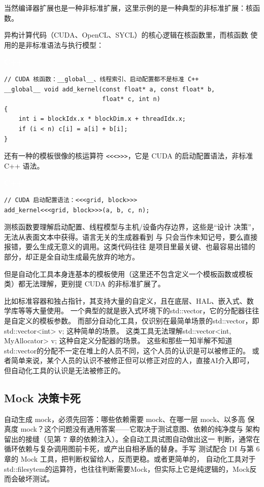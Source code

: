 \documentclass[12pt,a4paper,fontset=fandol]{ctexbook}
\newcommand{\cpplabel}{%
  \begin{tcolorbox}[enhanced,colback=cppheadbg,colframe=cppheadbg,
    arc=1mm,boxrule=0mm,left=6pt,right=6pt,top=2pt,bottom=2pt,
    halign=left,oversize]
    \textcolor{white}{\small\bfseries C++}
  \end{tcolorbox}\vspace{-4pt}}
\begin{document}
当然编译器扩展也是一种非标准扩展，这里示例的是一种典型的非标准扩展：核函数。

异构计算代码（CUDA、OpenCL、SYCL）的核心逻辑在核函数里，而核函数
使用的是非标准语法与执行模型：

\cpplabel
\begin{lstlisting}
// CUDA 核函数：__global__、线程索引、启动配置都不是标准 C++
__global__ void add_kernel(const float* a, const float* b,
                           float* c, int n)
{
    int i = blockIdx.x * blockDim.x + threadIdx.x;
    if (i < n) c[i] = a[i] + b[i];
}
\end{lstlisting}

还有一种的模板很像的核运算符 \texttt{<<<>>>}，它是 CUDA 的启动配置语法，非标准 C++ 语法。

\cpplabel
\begin{lstlisting}
// CUDA 启动配置语法：<<<grid, block>>>
add_kernel<<<grid, block>>>(a, b, c, n);
\end{lstlisting}

测核函数要理解启动配置、线程模型与主机/设备内存边界，这些是“设计
决策”，无法从表面文本中获得。语言无关的生成器看到
 与 
只会当作未知记号，要么直接报错，要么生成无意义的调用。这类代码往往
是项目里最关键、也最容易出错的部分，却正是全自动生成最先放弃的地方。

但是自动化工具本身连基本的模板使用（这里还不包含定义一个模板函数或模板类）都无法理解，更别提 CUDA 的非标准扩展了。

比如标准容器和独占指针，其支持大量的自定义，且在底层、HAL、嵌入式、数学库等等大量使用。
一个典型的就是嵌入式环境下的std::vector，它的分配器往往是自定义的模板参数。
而部分自动化工具，仅识别在最简单场景的std::vector，即std::vector<int> v; 这种简单的场景。
这类工具无法理解std::vector<int, MyAllocator> v; 这种自定义分配器的场景。
这些和那些一知半解不知道std::vector的分配不一定在堆上的人员不同，这个人员的认识是可以被修正的。
或者简单来说，某个人员的认识不被修正但可以修正对应的人，直接AI介入即可，但自动化工具的认识是无法被修正的。

\subsection{Mock 决策卡死}

自动生成 mock，必须先回答：哪些依赖需要 mock、在哪一层 mock、以多高
保真度 mock？这个问题没有通用答案——它取决于测试意图、依赖的纯净度与
架构留出的接缝（见第 7 章的依赖注入）。全自动工具试图自动做出这一
判断，通常在循环依赖与复杂调用图前卡死，或产出自相矛盾的替身。手写
测试配合 DI 与第 6 章的 Mock 工具，把判断权留给人，反而更稳。或者更简单的，
自动化工具对于std::filesytem的运算符，也往往判断需要Mock，但实际上它是纯逻辑的，Mock反而会破坏测试。
\end{document}

